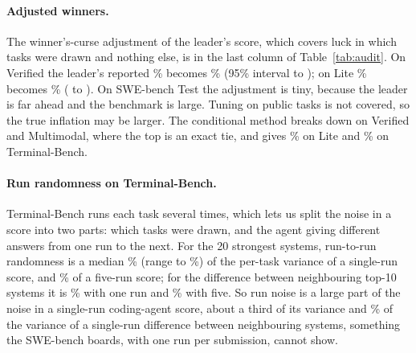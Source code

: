 \documentclass[11pt]{article}
\begin{document}
\paragraph{Adjusted winners.}
The winner's-curse adjustment of the leader's score, which covers luck in which tasks were drawn and nothing else, is in the last column of Table~\ref{tab:audit}.
On Verified the leader's reported \NumVerifiedWinnerObs\% becomes \NumVerifiedWinnerAdj\% (95\% interval \NumVerifiedWinnerCiLo{} to \NumVerifiedWinnerCiHi); on Lite \NumLiteWinnerObs\% becomes \NumLiteWinnerAdj\% (\NumLiteWinnerCiLo{} to \NumLiteWinnerCiHi).
On SWE-bench Test the adjustment is tiny, because the leader is far ahead and the benchmark is large.
Tuning on public tasks is not covered, so the true inflation may be larger.
The conditional method breaks down on Verified and Multimodal, where the top is an exact tie, and gives \NumLiteCondAdj\% on Lite and \NumTBCondAdj\% on Terminal-Bench.

\paragraph{Run randomness on Terminal-Bench.}
Terminal-Bench runs each task several times, which lets us split the noise in a score into two parts: which tasks were drawn, and the agent giving different answers from one run to the next.
For the 20 strongest systems, run-to-run randomness is a median \NumTBRunShareSingle\% (range \NumTBRunShareSingleMin{} to \NumTBRunShareSingleMax\%) of the per-task variance of a single-run score, and \NumTBRunShareFive\% of a five-run score; for the difference between neighbouring top-10 systems it is \NumTBPairRunShareSingle\% with one run and \NumTBPairRunShareFive\% with five.
So run noise is a large part of the noise in a single-run coding-agent score, about a third of its variance and \NumTBPairRunShareSingle\% of the variance of a single-run difference between neighbouring systems, something the SWE-bench boards, with one run per submission, cannot show.
\end{document}
